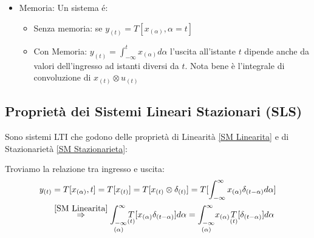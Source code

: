 \begin{itemize}
            \item {Memoria:
                Un sistema é:
                \begin{itemize}
                    \item {Senza memoria: se $y_{(t)} = T[x_{(\alpha)},\alpha=t]$}
                    \item {Con Memoria: $y_{(t)} =\int_{-\infty}^{t}x_{(\alpha)} d\alpha$ l'uscita all'istante $t$ dipende anche da valori dell'ingresso 
                          ad istanti diversi da $t$. Nota bene è l'integrale di convoluzione di $x_{(t)} \otimes u_{(t)}$ 
                    }
                \end{itemize}
            }\label{SM Memoria}
        \end{itemize}
    \subsection{Proprietà dei Sistemi Lineari Stazionari (SLS)}
        Sono sistemi LTI che godono delle proprietà di Linearità \ref{SM Linearita} e di Stazionarietà \ref*{SM Stazionarieta}:
        \begin{figure}[H]
            \centering 
        \label{Def SLS}
        \end{figure}  
        Troviamo la relazione tra ingresso e uscita:
        \begin{align}
            y_{(t)} &= T[x_{(\alpha)},t] =T[x_{(t)}] = T[x_{(t)} \otimes \delta_{(t)}] = T[\int_{-\infty}^{\infty}x_{(\alpha)}\delta_{(t-\alpha)}d\alpha]\nonumber \\        
                    &\overset{\ref*{SM Linearita}}{\Rightarrow} \underset{(\alpha)}{\int_{-\infty}^{\infty}}\underset{(t)}{T}[x_{(\alpha)}\delta_{(t-\alpha)}]d\alpha =\underset{(\alpha)}{\int_{-\infty}^{\infty}}x_{(\alpha)}\underset{(t)}{T}[\delta_{(t-\alpha)}]d\alpha\nonumber         
        \end{align}  
